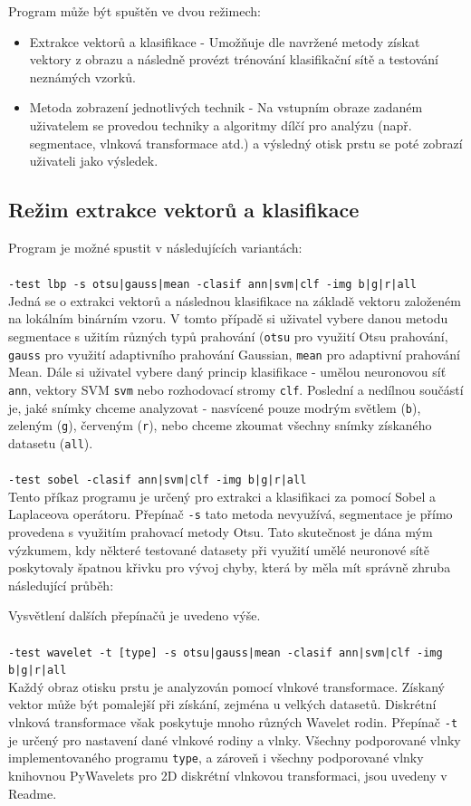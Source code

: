 Program může být spuštěn ve dvou režimech:
\begin{itemize}
    \item Extrakce vektorů a klasifikace - Umožňuje dle navržené metody získat vektory z obrazu a následně provézt trénování klasifikační sítě a testování neznámých vzorků.
    \item Metoda zobrazení jednotlivých technik - Na vstupním obraze zadaném uživatelem se provedou techniky a algoritmy dílčí pro analýzu (např. segmentace, vlnková transformace atd.) a výsledný otisk prstu se poté zobrazí uživateli jako výsledek.
\end{itemize}

\subsection{Režim extrakce vektorů a klasifikace}
Program je možné spustit v následujících variantách:\\\\
\verb=-test lbp -s otsu|gauss|mean -clasif ann|svm|clf -img b|g|r|all=\\
Jedná se o extrakci vektorů a následnou klasifikace na základě vektoru založeném na lokálním binárním vzoru. V tomto případě si uživatel vybere danou metodu segmentace s užitím různých typů prahování (\verb=otsu= pro využití Otsu prahování, \verb=gauss= pro využití adaptivního prahování Gaussian, \verb=mean= pro adaptivní prahování Mean. Dále si uživatel vybere daný princip klasifikace - umělou neuronovou síť \verb=ann=, vektory SVM \verb=svm= nebo rozhodovací stromy \verb=clf=. Poslední a nedílnou součástí je, jaké snímky chceme analyzovat - nasvícené pouze modrým světlem (\verb=b=), zeleným (\verb=g=), červeným (\verb=r=), nebo chceme zkoumat všechny snímky získaného datasetu (\verb=all=).\\\\
\verb=-test sobel -clasif ann|svm|clf -img b|g|r|all=\\
Tento příkaz programu je určený pro extrakci a klasifikaci za pomocí Sobel a Laplaceova operátoru. Přepínač \verb=-s= tato metoda nevyužívá, segmentace je přímo provedena s využitím prahovací metody Otsu. Tato skutečnost je dána mým výzkumem, kdy některé testované datasety při využití umělé neuronové sítě poskytovaly špatnou křivku pro vývoj chyby, která by měla mít správně zhruba následující průběh:

Vysvětlení dalších přepínačů je uvedeno výše.\\\\
\verb=-test wavelet -t [type] -s otsu|gauss|mean -clasif ann|svm|clf -img b|g|r|all=\\
Každý obraz otisku prstu je analyzován pomocí vlnkové transformace. Získaný vektor může být pomalejší při získání, zejména u velkých datasetů. Diskrétní vlnková transformace však poskytuje mnoho různých Wavelet rodin. Přepínač \verb=-t= je určený pro nastavení dané vlnkové rodiny a vlnky. Všechny podporované vlnky implementovaného programu \verb=type=, a zároveň i všechny podporované vlnky knihovnou PyWavelets pro 2D diskrétní vlnkovou transformaci, jsou uvedeny v Readme. 

